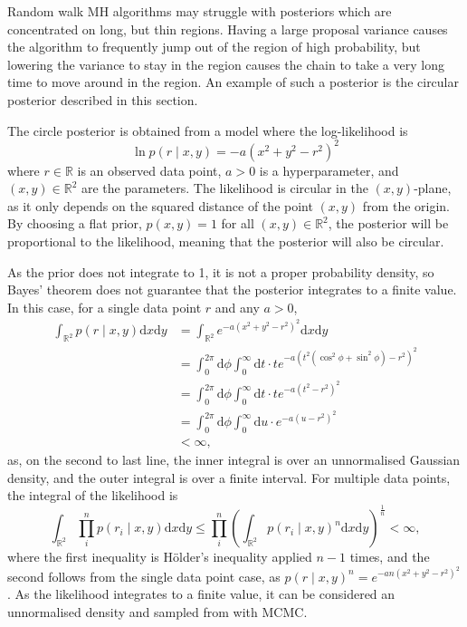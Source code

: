 \documentclass[english,twoside,openright]{HYgraduMLDS}
\newcommand{\R}{\mathbb{R}}
\newcommand{\dx}{\mathrm{d}}
\begin{document}
Random walk MH algorithms may struggle with posteriors which are concentrated
on long, but thin regions. Having a large proposal variance causes the algorithm
to frequently jump out of the region of high probability, but lowering the
variance to stay in the region causes the chain to take a very long time to move
around in the region. An example of such a posterior is the circular posterior
described in this section.

The circle posterior is obtained from a model where the log-likelihood is
\[
    \ln p(r\mid x, y) = -a(x^2 + y^2 - r^2)^2
\]
where \(r\in \R\) is an observed data point, \(a > 0\) is a hyperparameter,
and \((x, y)\in \R^{2}\) are the parameters.
The likelihood is circular in the \((x, y)\)-plane, as it only depends on the
squared distance of the point \((x, y)\) from the origin. By choosing a flat
prior, \(p(x, y) = 1\) for all \((x, y)\in \R^{2}\), the posterior will be
proportional to the likelihood, meaning that the posterior will also be circular.

As the prior does not integrate to 1, it is not a proper probability density,
so Bayes' theorem does not guarantee that the posterior integrates to a finite
value. In this case, for a single data point \(r\) and any \(a > 0\),
\begin{align*}
  \int_{\R^{2}}p(r\mid x, y)\dx x\dx y
  &= \int_{\R^{2}}e^{-a(x^{2} + y^{2} - r^{2})^{2}}\dx x\dx y
  \\&= \int_{0}^{2\pi}\dx \phi \int_{0}^{\infty}\dx t
  \cdot te^{-a(t^{2}(\cos^{2} \phi + \sin^{2} \phi) - r^{2})^{2}}
  \\&= \int_{0}^{2\pi}\dx \phi \int_{0}^{\infty}\dx t
  \cdot te^{-a(t^{2} - r^{2})^{2}}
  \\&= \int_{0}^{2\pi}\dx \phi \int_{0}^{\infty}\dx u\cdot e^{-a(u - r^{2})^{2}}
  \\&< \infty,
\end{align*}
as, on the second to last line, the inner integral is over an unnormalised
Gaussian density, and
the outer integral is over a finite interval. For multiple data points, the
integral of the likelihood is
\[
  \int_{\R^{2}}\prod_{i}^{n}p(r_{i}\mid x,y)\dx x\dx y
  \leq \prod_{i}^{n}\left(\int_{\R^{2}}p(r_{i}\mid x,y)^{n}\dx x\dx y\right)^{\frac{1}{n}}
  < \infty,
\]
where the first inequality is Hölder's inequality applied \(n - 1\) times,
and the second follows from the single data point case, as
\(p(r\mid x,y)^{n} = e^{-an(x^{2} + y^{2} - r^{2})^{2}}\).
As the likelihood integrates to a
finite value, it can be considered an unnormalised density and sampled from
with MCMC.
\end{document}
